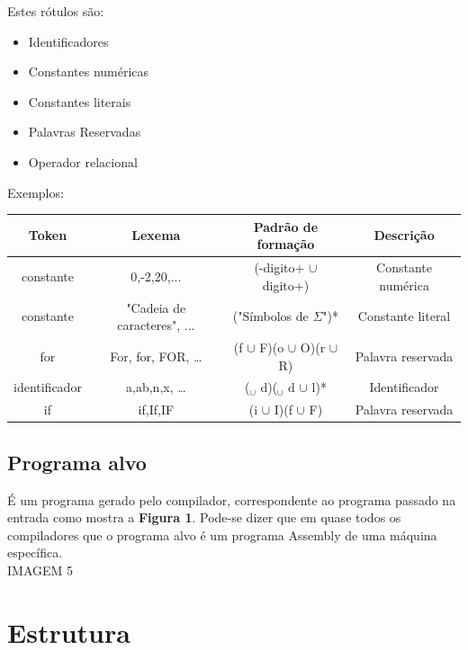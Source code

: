 Estes rótulos são:

\begin{itemize}
\item Identificadores
\item Constantes numéricas
\item Constantes literais
\item Palavras Reservadas
\item Operador relacional
\end{itemize}

Exemplos:\\

\begin{table}[!h]%
{}%
\begin{tabular}{|c|c|c|c|}

\textbf{Token} & \textbf{Lexema} & \textbf{Padrão de formação} & \textbf{Descrição} \\
\hline
constante & 0,-2,20,... & (-digito+ $\cup$ digito+) & Constante numérica \\
\hline
constante & "Cadeia de caracteres", ... & ("Símbolos de $\Sigma$")* & Constante literal\\
\hline
for & For, for, FOR, … & (f $\cup$ F)(o $\cup$ O)(r $\cup$ R) & Palavra reservada\\
\hline
identificador & a,ab,n,x, … & ($_ \cup$ d)($_ \cup$ d $\cup$ l)* & Identificador\\
\hline
if & if,If,IF & (i $\cup$ I)(f $\cup$ F) & Palavra reservada\\
\end{tabular}
\end{table}

\subsection{Programa alvo}
É um programa gerado pelo compilador, correspondente ao programa passado na entrada como mostra a \textbf{Figura 1}. Pode-se dizer que em quase todos os compiladores que o programa alvo é um programa Assembly de uma máquina específica.\\

IMAGEM 5\\

\section{Estrutura}

